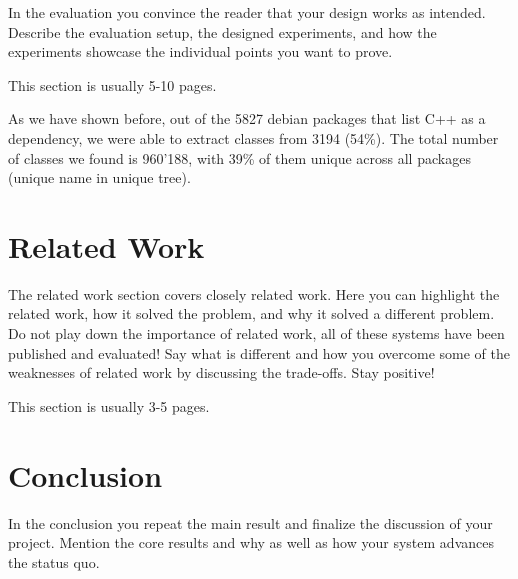 \documentclass[a4paper,11pt,oneside]{report}
\begin{document}
In the evaluation you convince the reader that your design works as intended.
Describe the evaluation setup, the designed experiments, and how the
experiments showcase the individual points you want to prove.

This section is usually 5-10 pages.



As we have shown before, out of the 5827 debian packages that list C++ as a dependency, we were able to extract classes from 3194 (54\%).
The total number of classes we found is 960'188, with 39\% of them unique across all packages (unique name in unique tree).



\chapter{Related Work}

The related work section covers closely related work. Here you can highlight
the related work, how it solved the problem, and why it solved a different
problem. Do not play down the importance of related work, all of these
systems have been published and evaluated! Say what is different and how
you overcome some of the weaknesses of related work by discussing the 
trade-offs. Stay positive!

This section is usually 3-5 pages.



\chapter{Conclusion}

In the conclusion you repeat the main result and finalize the discussion of
your project. Mention the core results and why as well as how your system
advances the status quo.

\cleardoublepage
{}
{}
\printbibliography

%
%
\end{document}
